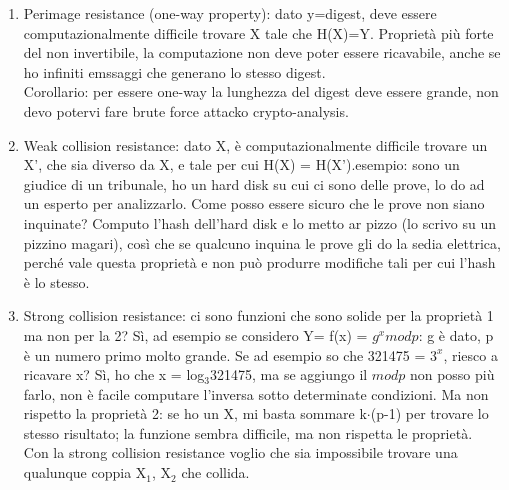 \documentclass[16px]{article}
\begin{document}
\begin{enumerate}
\item Perimage resistance (one-way property): dato y=digest, deve essere computazionalmente difficile trovare X tale che H(X)=Y. Proprietà più forte del non invertibile, la computazione non deve poter essere ricavabile, anche se ho infiniti emssaggi che generano lo stesso digest.\\ Corollario: per essere one-way la lunghezza del digest deve essere grande, non devo potervi fare brute force attacko crypto-analysis.
\item Weak collision resistance: dato X, è computazionalmente difficile trovare un X', che sia diverso da X, e tale per cui H(X) = H(X').esempio: sono un giudice di un tribunale, ho un hard disk su cui ci sono delle prove, lo do ad un esperto per analizzarlo. Come posso essere sicuro che le prove non siano inquinate? Computo l'hash dell'hard disk e lo metto ar pizzo (lo scrivo su un pizzino magari), così che se qualcuno inquina le prove gli do la sedia elettrica, perché vale questa proprietà e non può produrre modifiche tali per cui l'hash è lo stesso.
\item  Strong collision resistance: ci sono funzioni che sono solide per la proprietà 1 ma non per la 2? Sì, ad esempio se considero Y= f(x) = $g^xmodp$: g è dato, p è un numero primo molto grande. Se ad esempio so che 321475 = $3^x$, riesco a ricavare x? Sì, ho che x = log$_{3}$321475, ma se aggiungo il $modp$ non posso più farlo, non è facile computare l'inversa sotto determinate condizioni. Ma non rispetto la proprietà 2: se ho un X, mi basta sommare k$\cdot$(p-1) per trovare lo stesso risultato; la funzione sembra difficile, ma non rispetta le proprietà.\\ Con la strong collision resistance voglio che sia impossibile trovare una qualunque coppia X$_{1}$, X$_{2}$ che collida.

\end{enumerate}
\end{document}
